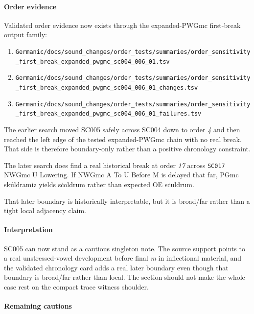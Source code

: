 \documentclass[
  british,
  a4paper,
]{article}
\providecommand{\tightlist}{%
  \setlength{\itemsep}{0pt}\setlength{\parskip}{0pt}}
\begin{document}
\paragraph{Order evidence}\label{order-evidence-2}

Validated order evidence now exists through the expanded-PWGmc
first-break output family:

\begin{enumerate}
\def\labelenumi{\arabic{enumi}.}
\tightlist
\item
  \texttt{Germanic/docs/sound\_changes/order\_tests/summaries/order\_sensitivity\_first\_break\_expanded\_pwgmc\_sc004\_006\_01.tsv}
\item
  \texttt{Germanic/docs/sound\_changes/order\_tests/summaries/order\_sensitivity\_first\_break\_expanded\_pwgmc\_sc004\_006\_01\_changes.tsv}
\item
  \texttt{Germanic/docs/sound\_changes/order\_tests/summaries/order\_sensitivity\_first\_break\_expanded\_pwgmc\_sc004\_006\_01\_failures.tsv}
\end{enumerate}

The earlier search moved SC005 safely across SC004 down to order
\emph{4} and then reached the left edge of the tested expanded-PWGmc
chain with no real break. That side is therefore boundary-only rather
than a positive chronology constraint.

The later search does find a real historical break at order \emph{17}
across \texttt{SC017} NWGmc U Lowering. If NWGmc A To U Before M is
delayed that far, PGmc skúldramiz yields sċoldrum rather than expected
OE sċuldrum.

That later boundary is historically interpretable, but it is broad/far
rather than a tight local adjacency claim.

\paragraph{Interpretation}\label{interpretation-2}

SC005 can now stand as a cautious singleton note. The source support
points to a real unstressed-vowel development before final \emph{m} in
inflectional material, and the validated chronology card adds a real
later boundary even though that boundary is broad/far rather than local.
The section should not make the whole case rest on the compact trace
witness shoulder.

\paragraph{Remaining cautions}\label{remaining-cautions-2}
\end{document}
